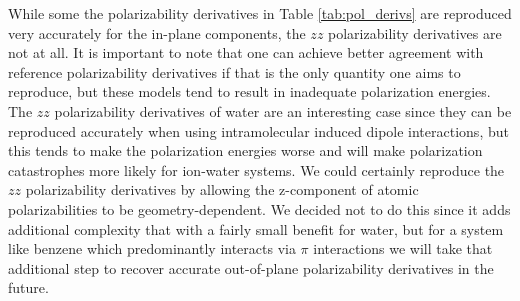 \documentclass[journal=jctcce,manuscript=article]{achemso}
\begin{document}
While some the polarizability derivatives in Table \ref{tab:pol_derivs} are reproduced very accurately for the in-plane components, the $zz$ polarizability derivatives are not at all. It is important to note that one can achieve better agreement with reference polarizability derivatives if that is the only quantity one aims to reproduce, but these models tend to result in inadequate polarization energies.  %
The $zz$ polarizability derivatives of water are an interesting case since they can be reproduced accurately when using intramolecular induced dipole interactions, but this tends to make the polarization energies worse and will make polarization catastrophes more likely for ion-water systems. We could certainly reproduce the $zz$ polarizability derivatives by allowing the z-component of atomic polarizabilities to be geometry-dependent. We decided not to do this since it adds additional complexity that with a fairly small benefit for water, but for a system like benzene which predominantly interacts via $\pi$ interactions we will take that additional step to recover accurate out-of-plane polarizability derivatives in the future.

\end{document}
